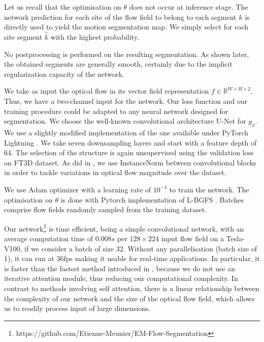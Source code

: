 \documentclass[10pt,twocolumn,letterpaper]{article}
\begin{document}
Let us recall that the optimisation on $\theta$ does not occur at inference stage. The network prediction for each site of the flow field to belong to each segment $k$ is directly used to yield the motion segmentation map. We simply select for each site segment $\hat{k}$ with the highest probability. 

No postprocessing is performed on the resulting segmentation. As shown later, the obtained segments are generally smooth, certainly due to the implicit regularization capacity of the network.

We take as input the optical flow in its vector field representation $f\in \mathbb R^{W \times H \times 2}$. Thus, we have a two-channel input for the network. Our loss function and our training procedure could be adapted to any neural network designed for segmentation. We choose the well-known convolutional architecture U-Net \cite{ronneberger_Unet_2015} for $g_{\phi}$. We use a slightly modified implementation of the one available under PyTorch Lightning \cite{lightningbolt20}. We take seven downsampling layers and start with a feature depth of 64. The selection of the structure is again unsupervised using the validation loss on FT3D dataset. As did in \cite{meunier2021}, we use InstanceNorm between convolutional blocks in order to tackle variations in optical flow magnitude over the dataset.

We use Adam \cite{adam2014} optimizer with a learning rate of $10^{-4}$ to train the network. 
The optimisation on $\theta$ is done with Pytorch implementation of L-BGFS \cite{lbgfs89}. {\color{black} Batches comprise flow fields randomly sampled from the training dataset.}

Our network\footnote{https://github.com/Etienne-Meunier/EM-Flow-Segmentation} is time efficient, being a simple convolutional network, with an average computation time of $0.008s$ per $128 \times 224$ input flow field on a Tesla-V100, if we consider a batch of size $32$. Without any parallelisation (batch size of $1$), it can run at 36fps making it usable for real-time applications. In particular, it is faster than the fastest method introduced in \cite{yang_motion-grouping_2021}, because we do not use an iterative attention module, thus reducing our computational complexity. In contrast to methods involving self attention, there is a linear relationship between the complexity of our network and the size of the optical flow field, which allows us to readily process input of large dimensions.
\end{document}
